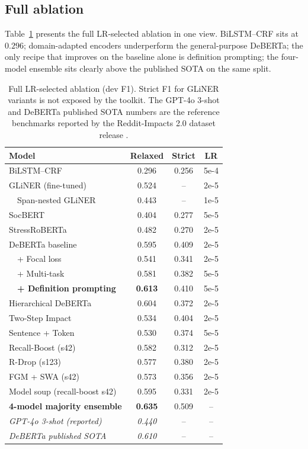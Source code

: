 \documentclass[11pt]{article}
\begin{document}
\subsection{Full ablation}

Table~\ref{tab:full} presents the full LR-selected ablation in one
view. BiLSTM--CRF sits at $0.296$; domain-adapted encoders underperform
the general-purpose DeBERTa; the only recipe that improves on the baseline alone is definition prompting; the four-model ensemble sits
clearly above the published SOTA on the same split.

\begin{table}[t]
\centering\small
\setlength{\tabcolsep}{5pt}
\begin{tabular}{lccc}
\toprule
Model & Relaxed & Strict & LR \\
\midrule
BiLSTM--CRF                               & 0.296 & 0.256 & 5e-4 \\
GLiNER (fine-tuned)                       & 0.524 & -- & 2e-5 \\
\ \ Span-nested GLiNER                    & 0.443 & -- & 1e-5 \\
SocBERT                                   & 0.404 & 0.277 & 5e-5 \\
StressRoBERTa                             & 0.482 & 0.270 & 2e-5 \\
DeBERTa baseline                          & 0.595 & 0.409 & 2e-5 \\
\ \ + Focal loss                          & 0.541 & 0.341 & 2e-5 \\
\ \ + Multi-task                          & 0.581 & 0.382 & 5e-5 \\
\ \ \textbf{+ Definition prompting}       & \textbf{0.613} & 0.410 & 5e-5 \\
Hierarchical DeBERTa                      & 0.604 & 0.372 & 2e-5 \\
Two-Step Impact                           & 0.534 & 0.404 & 2e-5 \\
Sentence + Token                          & 0.530 & 0.374 & 5e-5 \\
Recall-Boost (s42)                        & 0.582 & 0.312 & 2e-5 \\
R-Drop (s123)                             & 0.577 & 0.380 & 2e-5 \\
FGM + SWA (s42)                           & 0.573 & 0.356 & 2e-5 \\
Model soup (recall-boost s42)             & 0.595 & 0.331 & 2e-5 \\
\textbf{4-model majority ensemble}        & \textbf{0.635} & 0.509 & -- \\
\midrule
\textit{GPT-4o 3-shot (reported)}         & \textit{0.440} & -- & -- \\
\textit{DeBERTa published SOTA}           & \textit{0.610} & -- & -- \\
\bottomrule
\end{tabular}
\caption{Full LR-selected ablation (dev F1). Strict F1 for GLiNER
variants is not exposed by the toolkit. The GPT-4o 3-shot and
DeBERTa published SOTA numbers are the reference benchmarks reported by
the Reddit-Impacts 2.0 dataset release \citep{dey2025reddit}.}
\label{tab:full}
\end{table}
\end{document}
